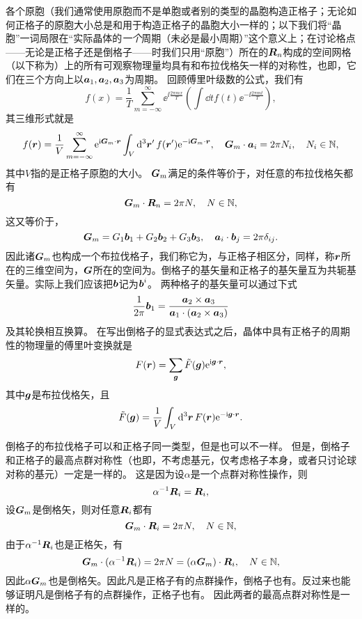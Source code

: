 各个原胞（我们通常使用原胞而不是单胞或者别的类型的晶胞构造正格子；无论如何正格子的原胞大小总是和用于构造正格子的晶胞大小一样的；以下我们将“晶胞”一词局限在“实际晶体的\emph{一个}周期（未必是最小周期）”这个意义上；在讨论格点——无论是正格子还是倒格子——时我们只用“原胞”）所在的$\vb*{R}_n$构成的空间网格（以下称为）上的所有可观察物理量均具有和布拉伐格矢一样的对称性，也即，它们在三个方向上以$\vb*{a}_1,\vb*{a}_2,\vb*{a}_3$为周期。
回顾傅里叶级数的公式，我们有
\[
    f(x) = \frac{1}{T} \sum_{m=-\infty}^\infty \ee^{\ii \frac{2\pi m x}{T}} \left(\int \dd{t} f(t) \ee^{-\ii \frac{2\pi m t}{T}}\right) ,
\]
其三维形式就是
\[
    f(\vb*{r}) = \frac{1}{V} \sum_{m=-\infty}^\infty \mathrm{e}^{\mathrm{i} \vb*{G}_m \cdot \vb*{r}} \int_V \dd[3]{\vb*{r}'} f(\vb*{r}') \mathrm{e}^{- \mathrm{i} \vb*{G}_m \cdot \vb*{r}}, \quad \vb*{G}_m \cdot \vb*{a}_i = 2\pi N_i, \quad N_i \in \mathbb{N},
\]
其中$V$指的是正格子原胞的大小。
$\vb*{G}_m$满足的条件等价于，对任意的布拉伐格矢都有
\begin{equation}
    \vb*{G}_m \cdot \vb*{R}_n = 2\pi N, \quad N \in \mathbb{N},
\end{equation}
这又等价于，
\begin{equation}
    \vb*{G}_m = G_1 \vb*{b}_1 + G_2 \vb*{b}_2 + G_3 \vb*{b}_3, \quad \vb*{a}_i \cdot \vb*{b}_j = 2 \pi \delta_{ij}.
\end{equation}
因此诸$\vb*{G}_m$也构成一个布拉伐格子，我们称它为，与正格子相区分，同样，称$\vb*{r}$所在的三维空间为，$\vb*{G}$所在的空间为。倒格子的基矢量和正格子的基矢量互为共轭基矢量。实际上我们应该把$\vb*{b}$记为$\vb*{b}^{i}$。
两种格子的基矢量可以通过下式
\begin{equation}
    \frac{1}{2\pi} \vb*{b}_1 = \frac{\vb*{a}_2 \times \vb*{a}_3}{\vb*{a}_1 \cdot (\vb*{a}_2 \times \vb*{a}_3)}
\end{equation}
及其轮换相互换算。
在写出倒格子的显式表达式之后，晶体中具有正格子的周期性的物理量的傅里叶变换就是
\begin{equation}
    F(\vb*{r}) = \sum_{\vb*{g}} \tilde{F}(\vb*{g}) \mathrm{e}^{\mathrm{i} \vb*{g} \cdot \vb*{r}},
\end{equation}
其中$\vb*{g}$是布拉伐格矢，且
\begin{equation}
    \tilde{F}(\vb*{g}) = \frac{1}{V} \int_V \dd[3]{\vb*{r}} F(\vb*{r}) \mathrm{e}^{-\mathrm{i} \vb*{g} \cdot \vb*{r}}.
\end{equation}

倒格子的布拉伐格子可以和正格子同一类型，但是也可以不一样。
但是，倒格子和正格子的最高点群对称性（也即，不考虑基元，仅考虑格子本身，或者只讨论球对称的基元）一定是一样的。
这是因为设$\alpha$是一个点群对称性操作，则
\[
    \alpha^{-1} \vb*{R}_i = \vb*{R}_i,
\]
设$\vb*{G}_m$是倒格矢，则对任意$\vb*{R}_i$都有
\[
    \vb*{G}_m \cdot \vb*{R}_i = 2 \pi N, \quad N \in \mathbb{N},
\]
由于$\alpha^{-1} \vb*{R}_i$也是正格矢，有
\[
    \vb*{G}_m \cdot (\alpha^{-1} \vb*{R}_i) = 2 \pi N = (\alpha \vb*{G}_m) \cdot \vb*{R}_i, \quad N \in \mathbb{N},
\]
因此$\alpha \vb*{G}_m$也是倒格矢。因此凡是正格子有的点群操作，倒格子也有。反过来也能够证明凡是倒格子有的点群操作，正格子也有。
因此两者的最高点群对称性是一样的。

